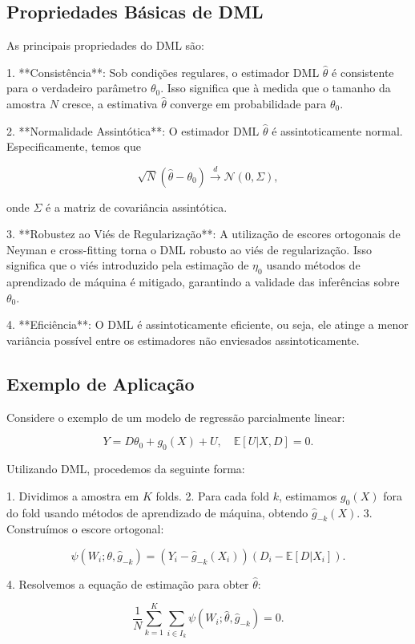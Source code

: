 \documentclass[a4paper,12pt]{article}[abntex2]
\begin{document}
\subsection*{Propriedades Básicas de DML}

As principais propriedades do DML são:

1. **Consistência**: Sob condições regulares, o estimador DML $\hat{\theta}$ é consistente para o verdadeiro parâmetro $\theta_0$. Isso significa que à medida que o tamanho da amostra $N$ cresce, a estimativa $\hat{\theta}$ converge em probabilidade para $\theta_0$.

2. **Normalidade Assintótica**: O estimador DML $\hat{\theta}$ é assintoticamente normal. Especificamente, temos que

\[
\sqrt{N}(\hat{\theta} - \theta_0) \xrightarrow{d} \mathcal{N}(0, \Sigma),
\]

onde $\Sigma$ é a matriz de covariância assintótica.

3. **Robustez ao Viés de Regularização**: A utilização de escores ortogonais de Neyman e cross-fitting torna o DML robusto ao viés de regularização. Isso significa que o viés introduzido pela estimação de $\eta_0$ usando métodos de aprendizado de máquina é mitigado, garantindo a validade das inferências sobre $\theta_0$.

4. **Eficiência**: O DML é assintoticamente eficiente, ou seja, ele atinge a menor variância possível entre os estimadores não enviesados assintoticamente.

\subsection*{Exemplo de Aplicação}

Considere o exemplo de um modelo de regressão parcialmente linear:

\[
Y = D\theta_0 + g_0(X) + U, \quad \mathbb{E}[U | X,D] = 0.
\]

Utilizando DML, procedemos da seguinte forma:

1. Dividimos a amostra em $K$ folds.
2. Para cada fold $k$, estimamos $g_0(X)$ fora do fold usando métodos de aprendizado de máquina, obtendo $\hat{g}_{-k}(X)$.
3. Construímos o escore ortogonal:

\[
\psi(W_i; \theta, \hat{g}_{-k}) = (Y_i - \hat{g}_{-k}(X_i))(D_i - \mathbb{E}[D | X_i]).
\]

4. Resolvemos a equação de estimação para obter $\hat{\theta}$:

\[
\frac{1}{N} \sum_{k=1}^K \sum_{i \in I_k} \psi(W_i; \hat{\theta}, \hat{g}_{-k}) = 0.
\]
\end{document}
